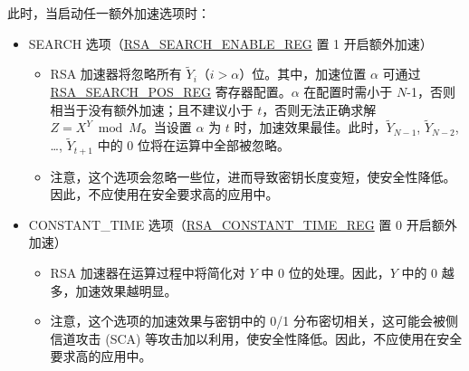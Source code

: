 \documentclass[main\_\_CN.tex]{subfiles}
\begin{document}
此时，当启动任一额外加速选项时：
\begin{itemize}
\item SEARCH 选项（\hyperref[regdesc:RSASEARCHENABLEREG]{RSA\_SEARCH\_ENABLE\_REG} 置 1 开启额外加速）
    \begin{itemize}
        \item RSA 加速器将忽略所有 \begin{math} \widetilde{Y}_{i} \end{math}（\begin{math} i > \alpha \end{math}）位。其中，加速位置 \begin{math} \alpha \end{math} 可通过 \hyperref[regdesc:RSASEARCHPOSREG]{RSA\_SEARCH\_POS\_REG} 寄存器配置。\begin{math} \alpha \end{math} 在配置时需小于 \begin{math}N\end{math}-1，否则相当于没有额外加速；且不建议小于 \begin{math} t \end{math}，否则无法正确求解 \begin{math}Z = X^{Y} \bmod M \end{math}。当设置 \begin{math} \alpha \end{math} 为 \begin{math} t \end{math} 时，加速效果最佳。此时，\begin{math}\widetilde{Y}_{N-1}\end{math}, \begin{math}\widetilde{Y}_{N-2}\end{math}, \dots, \begin{math}\widetilde{Y}_{t+1}\end{math} 中的 0 位将在运算中全部被忽略。
        \item 注意，这个选项会忽略一些位，进而导致密钥长度变短，使安全性降低。因此，不应使用在安全要求高的应用中。
    \end{itemize}
\item CONSTANT\_TIME 选项（\hyperref[regdesc:RSACONSTANTTIMEREG]{RSA\_CONSTANT\_TIME\_REG} 置 0 开启额外加速）
    \begin{itemize}
        \item RSA 加速器在运算过程中将简化对 \begin{math} Y \end{math} 中 0 位的处理。因此，\begin{math} Y \end{math} 中的 0 越多，加速效果越明显。
        \item 注意，这个选项的加速效果与密钥中的 0/1 分布密切相关，这可能会被侧信道攻击 (SCA) 等攻击加以利用，使安全性降低。因此，不应使用在安全要求高的应用中。
    \end{itemize}
\end{itemize}
\end{document}
